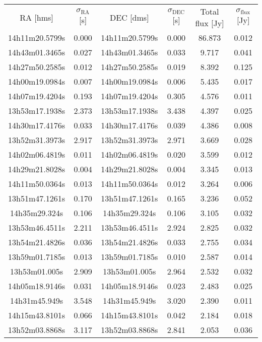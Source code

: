 \begin{longtable}{cccccc}\footnotesize
RA [hms] & $\sigma_\mathrm{RA}$ [s] & DEC [dms] & $\sigma_\mathrm{DEC}$ [s] & Total flux [Jy] & $\sigma_\mathrm{flux}$ [Jy] \\
14h11m20.5799s & 0.000 & 14h11m20.5799s & 0.000 & 86.873 & 0.012 \\
14h43m01.3465s & 0.027 & 14h43m01.3465s & 0.033 & 9.717 & 0.041 \\
14h27m50.2585s & 0.012 & 14h27m50.2585s & 0.019 & 8.392 & 0.125 \\
14h00m19.0984s & 0.007 & 14h00m19.0984s & 0.006 & 5.435 & 0.017 \\
14h07m19.4204s & 0.193 & 14h07m19.4204s & 0.305 & 4.576 & 0.011 \\
13h53m17.1938s & 2.373 & 13h53m17.1938s & 3.438 & 4.397 & 0.025 \\
14h30m17.4176s & 0.033 & 14h30m17.4176s & 0.039 & 4.386 & 0.008 \\
13h52m31.3973s & 2.917 & 13h52m31.3973s & 2.971 & 3.669 & 0.028 \\
14h02m06.4819s & 0.011 & 14h02m06.4819s & 0.020 & 3.599 & 0.012 \\
14h29m21.8028s & 0.004 & 14h29m21.8028s & 0.004 & 3.345 & 0.013 \\
14h11m50.0364s & 0.013 & 14h11m50.0364s & 0.012 & 3.264 & 0.006 \\
13h51m47.1261s & 0.170 & 13h51m47.1261s & 0.165 & 3.236 & 0.052 \\
14h35m29.324s & 0.106 & 14h35m29.324s & 0.106 & 3.105 & 0.032 \\
13h53m46.4511s & 2.211 & 13h53m46.4511s & 2.924 & 2.825 & 0.032 \\
13h54m21.4826s & 0.036 & 13h54m21.4826s & 0.033 & 2.755 & 0.034 \\
13h59m01.7185s & 0.013 & 13h59m01.7185s & 0.010 & 2.587 & 0.014 \\
13h53m01.005s & 2.909 & 13h53m01.005s & 2.964 & 2.532 & 0.032 \\
14h05m18.9146s & 0.031 & 14h05m18.9146s & 0.023 & 2.483 & 0.025 \\
14h31m45.949s & 3.548 & 14h31m45.949s & 3.020 & 2.390 & 0.011 \\
14h15m43.8101s & 0.066 & 14h15m43.8101s & 0.042 & 2.184 & 0.018 \\
13h52m03.8868s & 3.117 & 13h52m03.8868s & 2.841 & 2.053 & 0.036 \\

\end{longtable}
